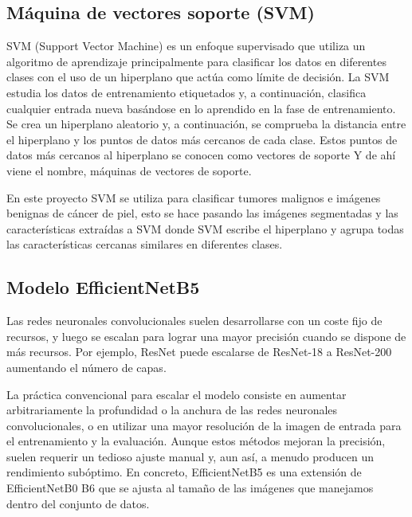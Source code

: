 	\subsection{Máquina de vectores soporte (SVM)}\label{sub:svm}
SVM (Support Vector Machine) es un enfoque supervisado que utiliza un algoritmo de aprendizaje principalmente para clasificar los datos en diferentes clases con el uso de un hiperplano que actúa como límite de decisión. 
La SVM estudia los datos de entrenamiento etiquetados y, a continuación, clasifica cualquier entrada nueva basándose en lo aprendido en la fase de entrenamiento. 
Se crea un hiperplano aleatorio y, a continuación, se comprueba la distancia entre el hiperplano y los puntos de datos más cercanos de cada clase. 
Estos puntos de datos más cercanos al hiperplano se conocen como vectores de soporte Y de ahí viene el nombre, máquinas de vectores de soporte.

En este proyecto SVM se utiliza para clasificar tumores malignos e imágenes benignas de cáncer de piel, esto se hace pasando las imágenes segmentadas y las características extraídas a SVM donde SVM escribe el hiperplano y agrupa todas las características cercanas similares en diferentes clases.

	\subsection{Modelo EfficientNetB5}\label{sub:efficientnetB5}
Las redes neuronales convolucionales %
suelen desarrollarse con un coste fijo de recursos, y luego se escalan para lograr una mayor precisión cuando se dispone de más recursos. 
Por ejemplo, ResNet puede escalarse de ResNet-18 a ResNet-200 aumentando el número de capas.

La práctica convencional para escalar el modelo consiste en aumentar arbitrariamente la profundidad o la anchura de las redes neuronales convolucionales, o en utilizar una mayor resolución de la imagen de entrada para el entrenamiento y la evaluación. 
Aunque estos métodos mejoran la precisión, suelen requerir un tedioso ajuste manual y, aun así, a menudo producen un rendimiento subóptimo.
En concreto, EfficientNetB5 %
es una extensión de EfficientNetB0 \- B6 que se ajusta al tamaño de las imágenes que manejamos dentro del conjunto de datos.


